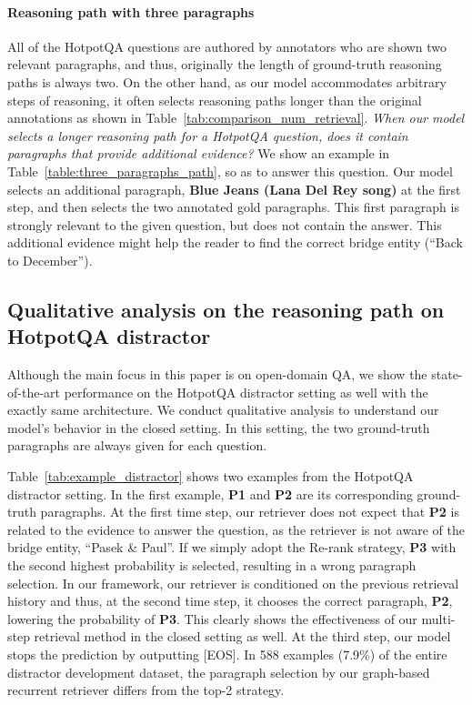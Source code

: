 \documentclass{article} \usepackage{iclr2020_conference,times}
\begin{document}
\paragraph{Reasoning path with three paragraphs}
All of the HotpotQA questions are authored by annotators who are shown two relevant paragraphs, and thus, originally the length of ground-truth reasoning paths is always two. 
On the other hand, as our model accommodates arbitrary steps of reasoning, it often selects reasoning paths longer than the original annotations as shown in Table~\ref{tab:comparison_num_retrieval}. 
{\it When our model selects a longer reasoning path for a HotpotQA question, does it contain paragraphs that provide additional evidence?
}
We show an example in Table~\ref{table:three_paragraphs_path}, so as to answer this question.
Our model selects an additional paragraph, {\bf Blue Jeans (Lana Del Rey song)} at the first step, and then selects the two annotated gold paragraphs. 
This first paragraph is strongly relevant to the given question, but does not contain the answer. This additional evidence might help the reader to find the correct bridge entity (``Back to December'').





\subsection{Qualitative analysis on the reasoning path on HotpotQA distractor}
Although the main focus in this paper is on open-domain QA, we show the state-of-the-art performance on the HotpotQA distractor setting as well with the exactly same architecture. 
We conduct qualitative analysis to understand our model's behavior in the closed setting.
In this setting, the two ground-truth paragraphs are always given for each question.

Table~\ref{tab:example_distractor} shows two examples from the HotpotQA distractor setting. 
In the first example, {\bf P1} and {\bf P2} are its corresponding ground-truth paragraphs.
At the first time step, our retriever does not expect that {\bf P2} is related to the evidence to answer the question, as the retriever is not aware of the bridge entity, ``Pasek \& Paul''.
If we simply adopt the Re-rank strategy, {\bf P3} with the second highest probability is selected, resulting in a wrong paragraph selection. 
In our framework, our retriever is conditioned on the previous retrieval history and thus, at the second time step, it chooses the correct paragraph, {\bf P2}, lowering the probability of {\bf P3}.
This clearly shows the effectiveness of our multi-step retrieval method in the closed setting as well.
At the third step, our model stops the prediction by outputting [EOS].
In 588 examples (7.9\%) of the entire distractor development dataset, the paragraph selection by our graph-based recurrent retriever differs from the top-2 strategy. 
\end{document}

